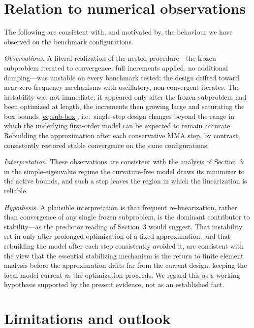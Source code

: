 \documentclass[11pt]{article}
\begin{document}
\section{Relation to numerical observations}

The following are consistent with, and motivated by, the behaviour we have
observed on the benchmark configurations.

\emph{Observations.} A literal realization of the nested procedure---the
frozen subproblem iterated to convergence, full increments applied, no
additional damping---was unstable on every benchmark tested: the design
drifted toward near-zero-frequency mechanisms with oscillatory,
non-convergent iterates. The instability was not immediate; it appeared
only after the frozen subproblem had been optimized at length, the
increments then growing large and saturating the box bounds
\eqref{eq:sub-box}, i.e.\ single-step design changes beyond the range in
which the underlying first-order model can be expected to remain accurate.
Rebuilding the approximation after each conservative MMA step, by contrast,
consistently restored stable convergence on the same configurations.

\emph{Interpretation.} These observations are consistent with the analysis
of Section~3: in the simple-eigenvalue regime the curvature-free model
draws its minimizer to the active bounds, and such a step leaves the region
in which the linearization is reliable.

\emph{Hypothesis.} A plausible interpretation is that frequent
re-linearization, rather than convergence of any single frozen subproblem,
is the dominant contributor to stability---as the predictor reading of
Section~3 would suggest. That instability set in only after prolonged
optimization of a fixed approximation, and that rebuilding the model after
each step consistently avoided it, are consistent with the view that the
essential stabilizing mechanism is the return to finite element analysis
before the approximation drifts far from the current design, keeping the
local model current as the optimization proceeds. We regard this as a
working hypothesis supported by the present evidence, not as an established
fact.

\section{Limitations and outlook}
\end{document}
